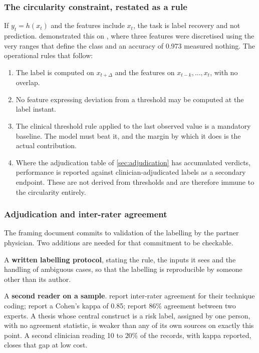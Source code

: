 \documentclass[12pt,a4paper,oneside]{report}
\begin{document}
\subsubsection{The circularity constraint, restated as a rule}\label{sec:label-rules}

If $y_t = h(x_t)$ and the features include $x_t$, the task is label recovery and not prediction.  demonstrated this on \textcite{efendi2025}, where three features were discretised using the very ranges that define the class and an accuracy of 0.973 measured nothing. The operational rules that follow:

\begin{enumerate}[nosep]
  \item The label is computed on $x_{t+\Delta}$ and the features on $x_{t-k}, \dots, x_t$, with no overlap.
  \item No feature expressing deviation from a threshold may be computed at the label instant.
  \item The clinical threshold rule applied to the last observed value is a mandatory baseline. The model must beat it, and the margin by which it does is the actual contribution.
  \item Where the adjudication table of \cref{sec:adjudication} has accumulated verdicts, performance is reported against clinician-adjudicated labels as a secondary endpoint. These are not derived from thresholds and are therefore immune to the circularity entirely.
\end{enumerate}

\subsubsection{Adjudication and inter-rater agreement}\label{sec:agreement}

The framing document commits to validation of the labelling by the partner physician. Two additions are needed for that commitment to be checkable.

A \textbf{written labelling protocol}, stating the rule, the inputs it sees and the handling of ambiguous cases, so that the labelling is reproducible by someone other than its author.

A \textbf{second reader on a sample}. \Textcite{zhou2024} report inter-rater agreement for their technique coding; \textcite{alessa2019} report a Cohen's kappa of 0.85; \textcite{dodoo2022} report 86\% agreement between two experts. A thesis whose central construct is a risk label, assigned by one person, with no agreement statistic, is weaker than any of its own sources on exactly this point. A second clinician reading 10 to 20\% of the records, with kappa reported, closes that gap at low cost.
\end{document}
